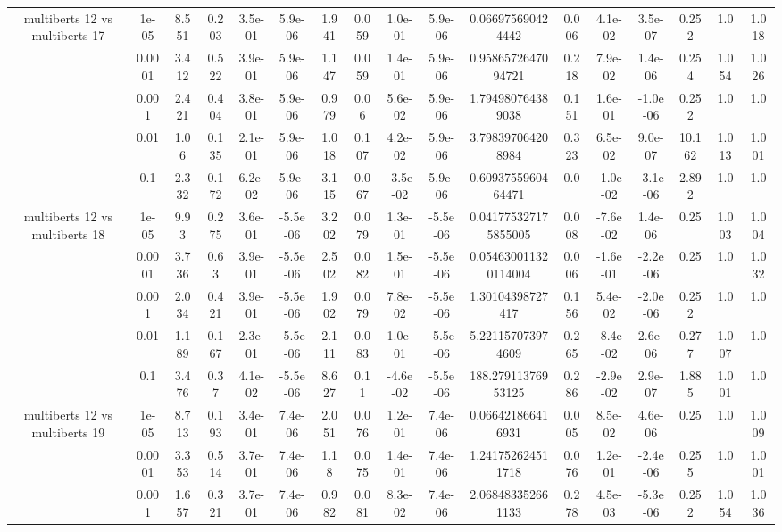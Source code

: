 \begin{tabular}{|c|c|c|c|c|c|c|c|c|c|c|c|c|c|c|c|c|}
\hline
\multirow{5}{*}{multiberts 12 vs multiberts 17} & 1e-05 & 8.551 & 0.203 & 3.5e-01 & 5.9e-06 & 1.941 & 0.059 & 1.0e-01 & 5.9e-06 & 0.066975690424442 & 0.006 & 4.1e-02 & 3.5e-07 & 0.252 & 1.0 & 1.018 \\
 & 0.0001 & 3.412 & 0.522 & 3.9e-01 & 5.9e-06 & 1.147 & 0.059 & 1.4e-01 & 5.9e-06 & 0.9586572647094721 & 0.218 & 7.9e-02 & 1.4e-06 & 0.254 & 1.054 & 1.026 \\
 & 0.001 & 2.421 & 0.404 & 3.8e-01 & 5.9e-06 & 0.979 & 0.06 & 5.6e-02 & 5.9e-06 & 1.794980764389038 & 0.151 & 1.6e-01 & -1.0e-06 & 0.252 & 1.0 & 1.0 \\
 & 0.01 & 1.06 & 0.135 & 2.1e-01 & 5.9e-06 & 1.018 & 0.107 & 4.2e-02 & 5.9e-06 & 3.798397064208984 & 0.323 & 6.5e-02 & 9.0e-07 & 10.162 & 1.013 & 1.001 \\
 & 0.1 & 2.332 & 0.172 & 6.2e-02 & 5.9e-06 & 3.115 & 0.067 & -3.5e-02 & 5.9e-06 & 0.6093755960464471 & 0.0 & -1.0e-02 & -3.1e-06 & 2.892 & 1.0 & 1.0 \\
\hline
\multirow{5}{*}{multiberts 12 vs multiberts 18} & 1e-05 & 9.93 & 0.275 & 3.6e-01 & -5.5e-06 & 3.202 & 0.079 & 1.3e-01 & -5.5e-06 & 0.041775327175855005 & 0.008 & -7.6e-02 & 1.4e-06 & 0.25 & 1.003 & 1.004 \\
 & 0.0001 & 3.736 & 0.63 & 3.9e-01 & -5.5e-06 & 2.502 & 0.082 & 1.5e-01 & -5.5e-06 & 0.054630011320114004 & 0.006 & -1.6e-01 & -2.2e-06 & 0.25 & 1.0 & 1.032 \\
 & 0.001 & 2.034 & 0.421 & 3.9e-01 & -5.5e-06 & 1.902 & 0.079 & 7.8e-02 & -5.5e-06 & 1.30104398727417 & 0.156 & 5.4e-02 & -2.0e-06 & 0.252 & 1.0 & 1.0 \\
 & 0.01 & 1.189 & 0.167 & 2.3e-01 & -5.5e-06 & 2.111 & 0.083 & 1.0e-01 & -5.5e-06 & 5.221157073974609 & 0.265 & -8.4e-02 & 2.6e-06 & 0.277 & 1.007 & 1.0 \\
 & 0.1 & 3.476 & 0.37 & 4.1e-02 & -5.5e-06 & 8.627 & 0.11 & -4.6e-02 & -5.5e-06 & 188.27911376953125 & 0.286 & -2.9e-02 & 2.9e-07 & 1.885 & 1.001 & 1.0 \\
\hline
\multirow{5}{*}{multiberts 12 vs multiberts 19} & 1e-05 & 8.713 & 0.193 & 3.4e-01 & 7.4e-06 & 2.051 & 0.076 & 1.2e-01 & 7.4e-06 & 0.066421866416931 & 0.005 & 8.5e-02 & 4.6e-06 & 0.25 & 1.0 & 1.009 \\
 & 0.0001 & 3.353 & 0.514 & 3.7e-01 & 7.4e-06 & 1.18 & 0.075 & 1.4e-01 & 7.4e-06 & 1.241752624511718 & 0.076 & 1.2e-01 & -2.4e-06 & 0.255 & 1.0 & 1.001 \\
 & 0.001 & 1.657 & 0.321 & 3.7e-01 & 7.4e-06 & 0.982 & 0.081 & 8.3e-02 & 7.4e-06 & 2.068483352661133 & 0.278 & 4.5e-03 & -5.3e-06 & 0.252 & 1.054 & 1.036 \\

\end{tabular}
